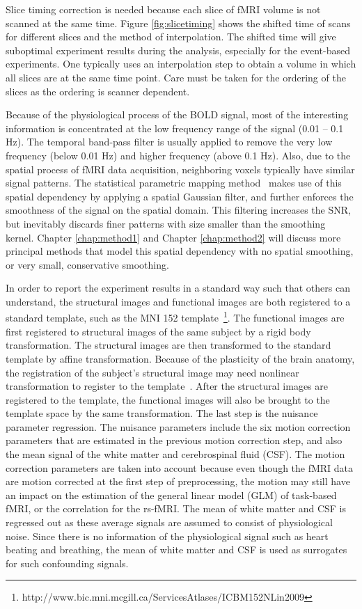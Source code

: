 Slice timing correction is needed because each slice of fMRI volume is not
scanned at the same time. Figure \ref{fig:slicetiming} shows the shifted time of
scans for different slices and the method of interpolation.  The shifted time
will give suboptimal experiment results during the analysis, especially for the
event-based experiments. One typically uses an interpolation step to obtain a
volume in which all slices are at the same time point. Care must be taken for
the ordering of the slices as the ordering is scanner dependent.


Because of the physiological process of the BOLD signal, most of the interesting
information is concentrated at the low frequency range of the signal (0.01 --
0.1 Hz). The temporal band-pass filter is usually applied to remove the very low
frequency (below 0.01 Hz) and higher frequency (above 0.1 Hz). Also, due to the
spatial process of fMRI data acquisition, neighboring voxels typically have
similar signal patterns. The statistical parametric mapping
method~\cite{friston2007statistical} makes use of this spatial dependency by
applying a spatial Gaussian filter, and further enforces the smoothness of the
signal on the spatial domain. This filtering increases the SNR, but inevitably
discards finer patterns with size smaller than the smoothing kernel. Chapter
\ref{chap:method1} and Chapter \ref{chap:method2} will discuss more principal
methods that model this spatial dependency with no spatial smoothing, or very
small, conservative smoothing.

In order to report the experiment results in a standard way such that others can
understand, the structural images and functional images are both registered to a
standard template, such as the MNI 152
template~\footnote{http://www.bic.mni.mcgill.ca/ServicesAtlases/ICBM152NLin2009}. The
functional images are first registered to structural images of the same subject
by a rigid body transformation. The structural images are then transformed to
the standard template by affine transformation. Because of the plasticity of the
brain anatomy, the registration of the subject's structural image may need
nonlinear transformation to register to the
template~\cite{jenkinson2012fsl}. After the structural images are registered to
the template, the functional images will also be brought to the template space
by the same transformation. The last step is the nuisance parameter
regression. The nuisance parameters include the six motion correction parameters
that are estimated in the previous motion correction step, and also the mean
signal of the white matter and cerebrospinal fluid (CSF). The motion correction
parameters are taken into account because even though the fMRI data are motion
corrected at the first step of preprocessing, the motion may still have an
impact on the estimation of the general linear model (GLM) of task-based fMRI,
or the correlation for the rs-fMRI. The mean of white matter and CSF is
regressed out as these average signals are assumed to consist of physiological
noise. Since there is no information of the physiological signal such as heart
beating and breathing, the mean of white matter and CSF is used as surrogates
for such confounding signals.

